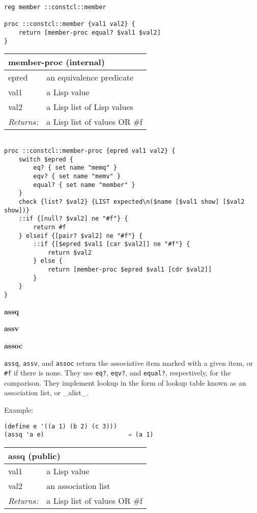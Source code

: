 \documentclass{report}
\begin{document}
\noindent\makebox[\linewidth]{\rule{\linewidth}{0.4pt}}
\begin{lstlisting}
reg member ::constcl::member
 
proc ::constcl::member {val1 val2} {
    return [member-proc equal? $val1 $val2]
}
\end{lstlisting}
\noindent\makebox[\linewidth]{\rule{\linewidth}{0.4pt}}
\begin{tabular}{ |l l| }
\hline
\multicolumn{2}{|l|}{member-proc (internal)} \\
\hline
epred & an equivalence predicate \\
val1 & a Lisp value \\
val2 & a Lisp list of Lisp values \\
\textit{Returns:} & a Lisp list of values OR \#f \\
\hline
\end{tabular}

\noindent\makebox[\linewidth]{\rule{\linewidth}{0.4pt}}
\begin{lstlisting}
 
proc ::constcl::member-proc {epred val1 val2} {
    switch $epred {
        eq? { set name "memq" }
        eqv? { set name "memv" }
        equal? { set name "member" }
    }
    check {list? $val2} {LIST expected\n($name [$val1 show] [$val2 show])}
    ::if {[null? $val2] ne "#f"} {
        return #f
    } elseif {[pair? $val2] ne "#f"} {
        ::if {[$epred $val1 [car $val2]] ne "#f"} {
            return $val2
        } else {
            return [member-proc $epred $val1 [cdr $val2]]
        }
    }
}
\end{lstlisting}
\noindent\makebox[\linewidth]{\rule{\linewidth}{0.4pt}}

\textbf{assq}


\textbf{assv}


\textbf{assoc}


\texttt{assq}, \texttt{assv}, and \texttt{assoc} return the associative item marked with a given item, or \texttt{\#f} if there is none. They use \texttt{eq?}, \texttt{eqv?}, and \texttt{equal?}, respectively, for the comparison. They implement lookup in the form of lookup table known as an association list, or \_alist\_.


Example:

\noindent\makebox[\linewidth]{\rule{\linewidth}{0.4pt}}
\begin{lstlisting}
(define e '((a 1) (b 2) (c 3)))
(assq 'a e)                       ⇒ (a 1)
\end{lstlisting}
\noindent\makebox[\linewidth]{\rule{\linewidth}{0.4pt}}
\begin{tabular}{ |l l| }
\hline
\multicolumn{2}{|l|}{assq (public)} \\
\hline
val1 & a Lisp value \\
val2 & an association list \\
\textit{Returns:} & a Lisp list of values OR \#f \\
\hline
\end{tabular}
\end{document}
